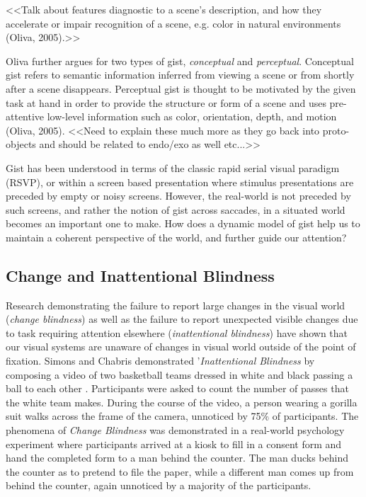 \documentclass[a4paper,10pt,final]{ThesisStyle}
\begin{document}
<<Talk about features diagnostic to a scene's description, and how they accelerate or impair recognition of a scene, e.g. color in natural environments (Oliva, 2005).>>

Oliva further argues for two types of gist, \textit{conceptual} and \textit{perceptual}.  Conceptual gist refers to semantic information inferred from viewing a scene or from shortly after a scene disappears. Perceptual gist is thought to be motivated by the given task at hand in order to provide the structure or form of a scene and uses pre-attentive low-level information such as color, orientation, depth, and motion (Oliva, 2005).  <<Need to explain these much more as they go back into proto-objects and should be related to endo/exo as well etc...>>
	
Gist has been understood in terms of the classic rapid serial visual paradigm (RSVP), or within a screen based presentation where stimulus presentations are preceded by empty or noisy screens.  However, the real-world is not preceded by such screens, and rather the notion of gist across saccades, in a situated world becomes an important one to make.  How does a dynamic model of gist help us to maintain a coherent perspective of the world, and further guide our attention?  

\subsection{Change and Inattentional Blindness}

Research demonstrating the failure to report large changes in the visual world (\textit{change blindness}) as well as the failure to report unexpected visible changes due to task requiring attention elsewhere (\textit{inattentional blindness}) \cite{Simons1999,Rensink2000,Rensink2001,Hollingworth2001a} have shown that our visual systems are unaware of changes in visual world outside of the point of fixation.  Simons and Chabris demonstrated '\textit{Inattentional Blindness} by composing a video of two basketball teams dressed in white and black passing a ball to each other \cite{Simons1999}.  Participants were asked to count the number of passes that the white team makes.  During the course of the video, a person wearing a gorilla suit walks across the frame of the camera, unnoticed by 75\% of participants.  The phenomena of \textit{Change Blindness} was demonstrated in a real-world psychology experiment \cite{Simons1998} where participants arrived at a kiosk to fill in a consent form and hand the completed form to a man behind the counter.  The man ducks behind the counter as to pretend to file the paper, while a different man comes up from behind the counter, again unnoticed by a majority of the participants.  
\end{document}
